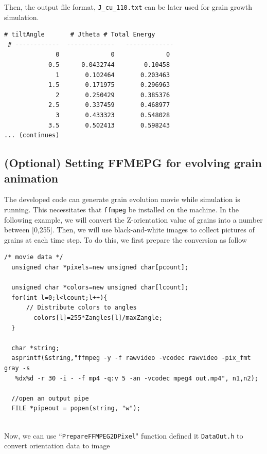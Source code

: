 \documentclass[11pt]{article}
\begin{document}
Then, the output file format, \texttt{J\_cu\_110.txt} can be later used for grain growth simulation.\\
\begin{tcolorbox}[colback=white]
\begin{lstlisting}[basicstyle=\footnotesize]
    # tiltAngle       # Jtheta # Total Energy
 # ------------  -------------   -------------
              0              0              0
            0.5      0.0432744        0.10458
              1       0.102464       0.203463
            1.5       0.171975       0.296963
              2       0.250429       0.385376
            2.5       0.337459       0.468977
              3       0.433323       0.548028
            3.5       0.502413       0.598243
... (continues)
\end{lstlisting}
\end{tcolorbox}

\subsection{(Optional) Setting FFMEPG for evolving grain animation}


The developed code can generate grain evolution movie while simulation is running.
This necessitates that \texttt{ffmpeg} be installed on the machine. 
In the following example, 
we will convert the Z-orientation value of grains into a number between 
[0,255]. Then, we will use black-and-white images to collect pictures of grains 
at each time step. 
To do this, we first prepare the conversion as follow 
\\

\begin{tcolorbox}
\begin{lstlisting}[basicstyle=\footnotesize]
  /* movie data */
  unsigned char *pixels=new unsigned char[pcount];
  
  unsigned char *colors=new unsigned char[lcount];
  for(int l=0;l<lcount;l++){
      // Distribute colors to angles
        colors[l]=255*Zangles[l]/maxZangle;
  }
  
  char *string;
  asprintf(&string,"ffmpeg -y -f rawvideo -vcodec rawvideo -pix_fmt gray -s 
   %dx%d -r 30 -i - -f mp4 -q:v 5 -an -vcodec mpeg4 out.mp4", n1,n2);
  
  //open an output pipe
  FILE *pipeout = popen(string, "w");
  
\end{lstlisting}
\end{tcolorbox}
Now, we can use ``\texttt{PrepareFFMPEG2DPixel}" function defined it
\texttt{DataOut.h} to convert orientation data to image
\end{document}

